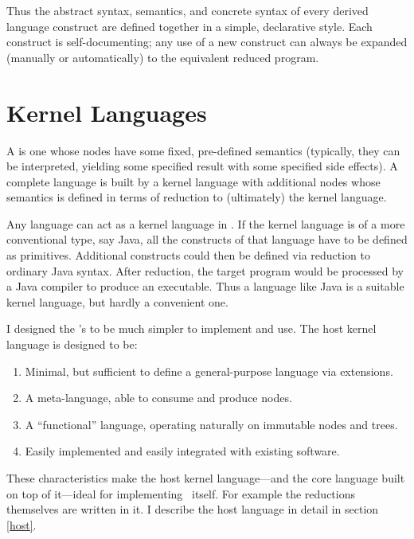 Thus the abstract syntax, semantics, and concrete syntax of every derived language construct are defined together in a simple, declarative style. Each construct is self-documenting; any use of a new construct can always be expanded (manually or automatically) to the equivalent reduced program.


%
%

\section{Kernel Languages}
\label{kernel}
A  is one whose nodes have some fixed, pre-defined semantics (typically, they can be interpreted, yielding some specified result with some specified side effects). A complete language is built by  a kernel language with additional nodes whose semantics is defined in terms of reduction to (ultimately) the kernel language.

Any language can act as a kernel language in \Meta. If the kernel language is of a more conventional type, say Java, all the constructs of that language have to be defined as primitives. Additional constructs could then be defined via reduction to ordinary Java syntax. After reduction, the target program would be processed by a Java compiler to produce an executable. Thus a language like Java is a suitable kernel language, but hardly a convenient one.

I designed the \Meta's  to be much simpler to implement and use. The host kernel language is designed to be:
\begin{enumerate}
\item Minimal, but sufficient to define a general-purpose language via extensions.
\item A meta-language, able to consume and produce nodes.
\item A ``functional'' language, operating naturally on immutable nodes and trees.
\item Easily implemented and easily integrated with existing software.
\end{enumerate}

These characteristics make the host kernel language---and the core language built on top of it---ideal for implementing \Meta\ itself. For example the reductions themselves are written in it. I describe the host language in detail in section \ref{host}.



